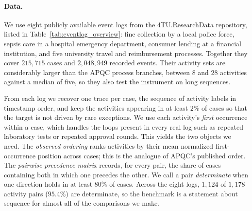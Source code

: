 \paragraph{Data.}
\label{app:eventlog_data}
We use eight publicly available event logs from the 4TU.ResearchData repository, listed in Table~\ref{tab:eventlog_overview}: fine collection by a local police force, sepsis care in a hospital emergency department, consumer lending at a financial institution, and five university travel and reimbursement processes.
Together they cover $215{,}715$ cases and $2{,}048{,}949$ recorded events.
Their activity sets are considerably larger than the APQC process branches, between $8$ and $28$ activities against a median of five, so they also test the instrument on long sequences.

From each log we recover one trace per case, the sequence of activity labels in timestamp order, and keep the activities appearing in at least $2\%$ of cases so that the target is not driven by rare exceptions.
We use each activity's \emph{first} occurrence within a case, which handles the loops present in every real log such as repeated laboratory tests or repeated approval rounds.
This yields the two objects we need.
The \emph{observed ordering} ranks activities by their mean normalized first-occurrence position across cases; this is the analogue of APQC's published order.
The \emph{pairwise precedence matrix} records, for every pair, the share of cases containing both in which one precedes the other.
We call a pair \emph{determinate} when one direction holds in at least $80\%$ of cases.
Across the eight logs, $1{,}124$ of $1{,}178$ activity pairs ($95.4\%$) are determinate, so the benchmark is a statement about sequence for almost all of the comparisons we make.


